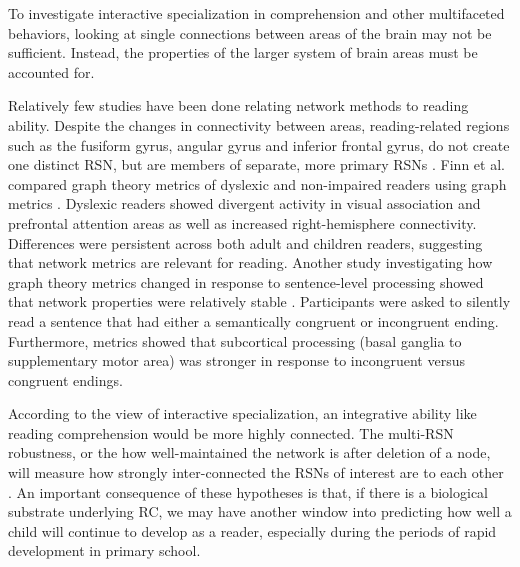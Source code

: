 To investigate interactive specialization in comprehension and other multifaceted behaviors, looking at single connections between areas of the brain may not be sufficient. Instead, the properties of the larger system of brain areas must be accounted for. 

Relatively few studies have been done relating network methods to reading ability. Despite the changes in connectivity between areas, reading-related regions such as the fusiform gyrus, angular gyrus and inferior frontal gyrus, do not create one distinct RSN, but are members of separate, more primary RSNs \cite{Vogel2013}. Finn et al. compared graph theory metrics of dyslexic and non-impaired readers using graph metrics \cite{Finn2014}. Dyslexic readers showed divergent activity in visual association and prefrontal attention areas as well as increased right-hemisphere connectivity. Differences were persistent across both adult and children readers, suggesting that network metrics are relevant for reading. Another study investigating how graph theory metrics changed in response to sentence-level processing showed that network properties were relatively stable \cite{Ye2012}. Participants were asked to silently read a sentence that had either a semantically congruent or incongruent ending. Furthermore, metrics showed that subcortical processing (basal ganglia to supplementary motor area) was stronger in response to incongruent versus congruent endings. 

According to the view of interactive specialization, an integrative ability like reading comprehension would be more highly connected. The multi-RSN robustness, or the how well-maintained the network is after deletion of a node, will measure how strongly inter-connected the RSNs of interest are to each other \cite{Bullmore2009}. An important consequence of these hypotheses is that, if there is a biological substrate underlying RC, we may have another window into predicting how well a child will continue to develop as a reader, especially during the periods of rapid development in primary school.




